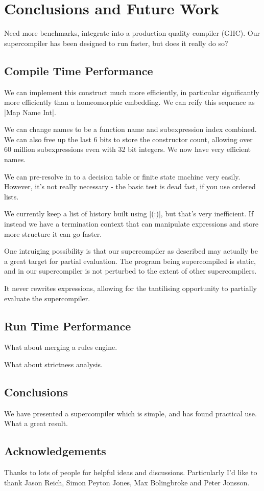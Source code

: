 \documentclass[draft]{sigplanconf}
\begin{document}
\section{Conclusions and Future Work}

Need more benchmarks, integrate into a production quality compiler (GHC). Our supercompiler has been designed to run faster, but does it really do so?

\subsection{Compile Time Performance}

We can implement this construct much more efficiently, in particular significantly more efficiently than a homeomorphic embedding. We can reify this sequence as |Map Name Int|.

We can change names to be a function name and subexpression index combined. We can also free up the last 6 bits to store the constructor count, allowing over 60 million subexpressions even with 32 bit integers. We now have very efficient names.

We can pre-resolve in to a decision table or finite state machine very easily. However, it's not really necessary - the basic test is dead fast, if you use ordered lists.

We currently keep a list of history built using |(:)|, but that's very inefficient. If instead we have a termination context that can manipulate expressions and store more structure it can go faster.

One intruiging possibility is that our supercompiler as described may actually be a great target for partial evaluation. The program being supercompiled is static, and in our supercompiler is not perturbed to the extent of other supercompilers.

It never rewrites expressions, allowing for the tantilising opportunity to partially evaluate the supercompiler.


\subsection{Run Time Performance}

What about merging a rules engine.

What about strictness analysis.

\subsection{Conclusions}

We have presented a supercompiler which is simple, and has found practical use. What a great result.


\subsection{Acknowledgements}

Thanks to lots of people for helpful ideas and discussions. Particularly I'd like to thank Jason Reich, Simon Peyton Jones, Max Bolingbroke and Peter Jonsson.



\end{document}
